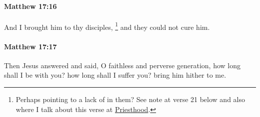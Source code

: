 		\paragraph{Matthew 17:16} %
			\label{MATTHEW-17-16}

			And I brought him to thy disciples,
				\footnote{%
					Perhaps pointing to a lack of  in them? See note at verse 21 below and also where I talk about this verse at \hyperref[PRIESTHOOD]{Priesthood}.
					}%
			and they could not cure him.

			\begin{framed}
			\scriptsize
				\begin{compactdesc}
					\item[SBLG] 
				\end{compactdesc}
			\end{framed}

		\paragraph{Matthew 17:17} %
			\label{MATTHEW-17-17}

			Then Jesus answered and said, O faithless and perverse generation, how long shall I be with you? how long shall I suffer you? bring him hither to me.

